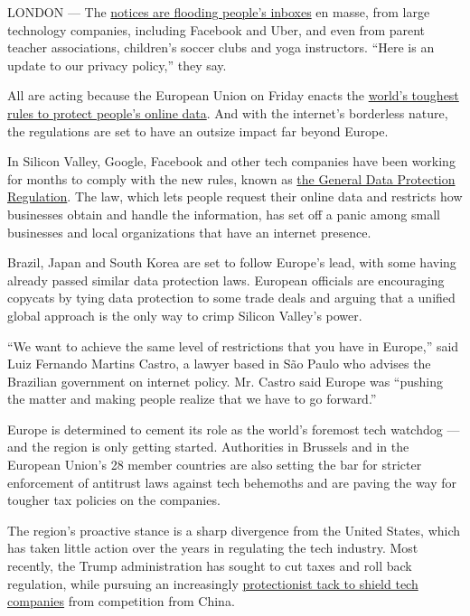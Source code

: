 LONDON --- The
\href{https://www.nytimes.com/2018/05/23/technology/personaltech/what-you-should-look-for-europe-data-law.html?rref=collection\%2Fcolumn\%2Ftech-fix\&action=click\&contentCollection=personaltech\&region=stream\&module=stream_unit\&version=latest\&contentPlacement=1\&pgtype=collection}{notices
are flooding people's inboxes} en masse, from large technology
companies, including Facebook and Uber, and even from parent teacher
associations, children's soccer clubs and yoga instructors. ``Here is an
update to our privacy policy,'' they say.

All are acting because the European Union on Friday enacts the
\href{https://www.nytimes.com/2020/05/22/business/facebook-privacy-law-grandmother.html}{world's
toughest rules to protect people's online data}. And with the internet's
borderless nature, the regulations are set to have an outsize impact far
beyond Europe.

In Silicon Valley, Google, Facebook and other tech companies have been
working for months to comply with the new rules, known as
\href{https://gdpr-info.eu/}{the General Data Protection Regulation}.
The law, which lets people request their online data and restricts how
businesses obtain and handle the information, has set off a panic among
small businesses and local organizations that have an internet presence.

Brazil, Japan and South Korea are set to follow Europe's lead, with some
having already passed similar data protection laws. European officials
are encouraging copycats by tying data protection to some trade deals
and arguing that a unified global approach is the only way to crimp
Silicon Valley's power.

``We want to achieve the same level of restrictions that you have in
Europe,'' said Luiz Fernando Martins Castro, a lawyer based in São Paulo
who advises the Brazilian government on internet policy. Mr. Castro said
Europe was ``pushing the matter and making people realize that we have
to go forward.''

Europe is determined to cement its role as the world's foremost tech
watchdog --- and the region is only getting started. Authorities in
Brussels and in the European Union's 28 member countries are also
setting the bar for stricter enforcement of antitrust laws against tech
behemoths and are paving the way for tougher tax policies on the
companies.

The region's proactive stance is a sharp divergence from the United
States, which has taken little action over the years in regulating the
tech industry. Most recently, the Trump administration has sought to cut
taxes and roll back regulation, while pursuing an increasingly
\href{https://www.nytimes.com/2018/03/23/technology/trump-china-tariffs-tech-cold-war.html}{protectionist
tack to shield tech companies} from competition from China.

